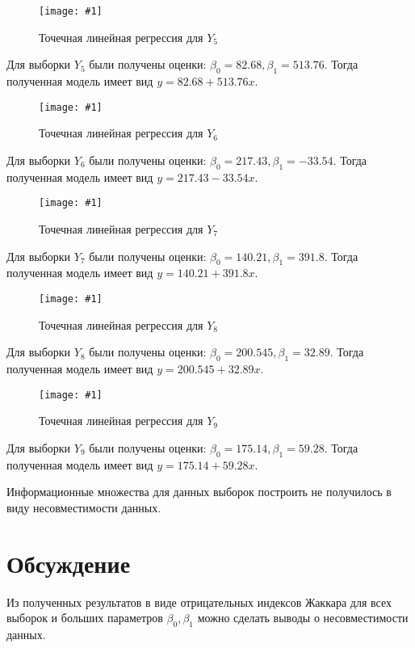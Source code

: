 \documentclass[a4paper,12pt]{article}
\newcommand{\plot}[3]{
    \begin{figure}[H]
        \begin{center}
            \texttt{[image: \#1]}
            \caption{#2}
            \label{#3}
        \end{center}
    \end{figure}
}
\begin{document}
    \plot{PointRegressionsampleY5}{Точечная линейная регрессия для $ Y_5 $}{p:regressionY5}
        Для выборки $ Y_5 $ были получены оценки: $ \beta_0 = 82.68, \beta_1 = 513.76 $.
    Тогда полученная модель имеет вид $ y =  82.68 + 513.76 x $.
    
    \plot{PointRegressionsampleY6}{Точечная линейная регрессия для $ Y_6 $}{p:regressionY6}
        Для выборки $ Y_6 $ были получены оценки: $ \beta_0 = 217.43, \beta_1 = -33.54 $.
    Тогда полученная модель имеет вид $ y =  217.43 - 33.54x $.
    
    \plot{PointRegressionsampleY7}{Точечная линейная регрессия для $ Y_7 $}{p:regressionY7}
        Для выборки $ Y_7 $ были получены оценки: $ \beta_0 = 140.21, \beta_1 = 391.8 $.
    Тогда полученная модель имеет вид $ y =  140.21 + 391.8 x $.
    
    \plot{PointRegressionsampleY8}{Точечная линейная регрессия для $ Y_8 $}{p:regressionY8}
        Для выборки $ Y_8 $ были получены оценки: $ \beta_0 = 200.545, \beta_1 = 32.89 $.
    Тогда полученная модель имеет вид $ y =  200.545 + 32.89 x $.
    
    \plot{PointRegressionsampleY9}{Точечная линейная регрессия для $ Y_9 $}{p:regressionY9}
        Для выборки $ Y_9 $ были получены оценки: $ \beta_0 = 175.14, \beta_1 = 59.28 $.
    Тогда полученная модель имеет вид $ y =  175.14 + 59.28 x $.
    
   

    Информационные множества для данных выборок построить не получилось в виду несовместимости данных.




    \section{Обсуждение}
    \quad Из полученных результатов в виде отрицательных индексов Жаккара для всех выборок и больших параметров $ \beta_0 , \beta_1 $ можно сделать выводы о несовместимости данных.
\end{document}
